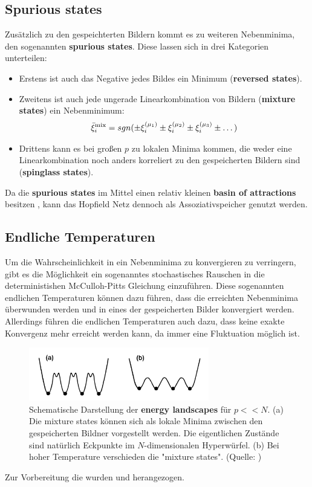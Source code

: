 \subsection{Spurious states}
Zusätzlich zu den gespeichterten Bildern kommt es zu weiteren Nebenminima, den sogenannten \textbf{spurious states}. Diese lassen sich in drei Kategorien unterteilen:
\begin{itemize}
\item Erstens ist auch das Negative jedes Bildes ein Minimum (\textbf{reversed states}).
\item Zweitens ist auch jede ungerade Linearkombination von Bildern (\textbf{mixture states}) ein Nebenminimum:
\begin{align}
\bar{\xi}_i^{\textup{mix}} = sgn(\pm \xi_i^{(\mu_1)} \pm \xi_i^{(\mu_2)} \pm \xi_i^{(\mu_3)} \pm \dots)
\end{align}
\item Drittens kann es bei großen $p$ zu lokalen Minima kommen, die weder eine Linearkombination noch anders korreliert zu den gespeicherten Bildern sind (\textbf{spinglass states}).
\end{itemize}
Da die \textbf{spurious states} im Mittel einen relativ kleinen \textbf{basin of attractions} besitzen , kann das Hopfield Netz dennoch als Assoziativspeicher genutzt werden.




\subsection{Endliche Temperaturen}
Um die Wahrscheinlichkeit in ein Nebenminima zu konvergieren zu verringern, gibt es die Möglichkeit ein sogenanntes stochastisches Rauschen in die deterministishen McCulloh-Pitts Gleichung einzuführen. Diese sogenannten endlichen Temperaturen können dazu führen, dass die erreichten Nebenminima überwunden werden und in eines der gespeicherten Bilder konvergiert werden. Allerdings führen  die endlichen Temperaturen auch dazu, dass keine exakte Konvergenz mehr erreicht werden kann, da immer eine Fluktuation möglich ist.

\begin{figure}[htp]
	\centering
	\includegraphics[width = 0.7\textwidth]{images/spurious_states_and_finite_temperature.pdf}
	\caption{Schematische Darstellung der \textbf{energy landscapes} für $p << N$. (a) Die mixture states können sich als lokale Minima zwischen den gespeicherten Bildner vorgestellt werden. Die eigentlichen Zustände sind natürlich Eckpunkte im $N$-dimensionalen Hyperwürfel. (b) Bei hoher Temperature verschieden die "mixture states". (Quelle: \cite{hertz_krogh_palmer})}
	\label{fig:spurious_states_and_finite_temperature}
\end{figure}


Zur Vorbereitung die wurden \cite{bunk} und \cite{hertz_krogh_palmer} herangezogen.


\clearpage